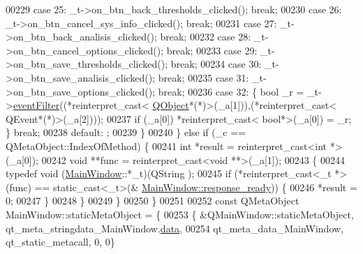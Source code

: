 \begin{DoxyCode}
00229         \textcolor{keywordflow}{case} 25: \_t->on\_btn\_back\_thresholds\_clicked(); \textcolor{keywordflow}{break};
00230         \textcolor{keywordflow}{case} 26: \_t->on\_btn\_cancel\_sys\_info\_clicked(); \textcolor{keywordflow}{break};
00231         \textcolor{keywordflow}{case} 27: \_t->on\_btn\_back\_analisis\_clicked(); \textcolor{keywordflow}{break};
00232         \textcolor{keywordflow}{case} 28: \_t->on\_btn\_cancel\_options\_clicked(); \textcolor{keywordflow}{break};
00233         \textcolor{keywordflow}{case} 29: \_t->on\_btn\_save\_thresholds\_clicked(); \textcolor{keywordflow}{break};
00234         \textcolor{keywordflow}{case} 30: \_t->on\_btn\_save\_analisis\_clicked(); \textcolor{keywordflow}{break};
00235         \textcolor{keywordflow}{case} 31: \_t->on\_btn\_save\_options\_clicked(); \textcolor{keywordflow}{break};
00236         \textcolor{keywordflow}{case} 32: \{ \textcolor{keywordtype}{bool} \_r = \_t->\hyperlink{a00017_a91df90bb5045775882c062cefdf903e9}{eventFilter}((*\textcolor{keyword}{reinterpret\_cast<} 
      \hyperlink{a00059}{QObject}*(*)\textcolor{keyword}{>}(\_a[1])),(*\textcolor{keyword}{reinterpret\_cast<} QEvent*(*)\textcolor{keyword}{>}(\_a[2])));
00237             \textcolor{keywordflow}{if} (\_a[0]) *\textcolor{keyword}{reinterpret\_cast<} \textcolor{keywordtype}{bool}*\textcolor{keyword}{>}(\_a[0]) = \_r; \}  \textcolor{keywordflow}{break};
00238         \textcolor{keywordflow}{default}: ;
00239         \}
00240     \} \textcolor{keywordflow}{else} \textcolor{keywordflow}{if} (\_c == QMetaObject::IndexOfMethod) \{
00241         \textcolor{keywordtype}{int} *result = \textcolor{keyword}{reinterpret\_cast<}\textcolor{keywordtype}{int} *\textcolor{keyword}{>}(\_a[0]);
00242         \textcolor{keywordtype}{void} **func = \textcolor{keyword}{reinterpret\_cast<}\textcolor{keywordtype}{void} **\textcolor{keyword}{>}(\_a[1]);
00243         \{
00244             \textcolor{keyword}{typedef} void (\hyperlink{a00017}{MainWindow}::*\_t)(QString );
00245             \textcolor{keywordflow}{if} (*reinterpret\_cast<\_t *>(func) == \textcolor{keyword}{static\_cast<}\_t\textcolor{keyword}{>}(&
      \hyperlink{a00017_a3f6396874778799cf07a7a0149e54977}{MainWindow::response\_ready})) \{
00246                 *result = 0;
00247             \}
00248         \}
00249     \}
00250 \}
00251 
00252 \textcolor{keyword}{const} QMetaObject MainWindow::staticMetaObject = \{
00253     \{ &QMainWindow::staticMetaObject, qt\_meta\_stringdata\_MainWindow.\hyperlink{a00066_a3d0c7851e40263cf43b0979ebc8eed83}{data},
00254       qt\_meta\_data\_MainWindow,  qt\_static\_metacall, 0, 0\}

\end{DoxyCode}
